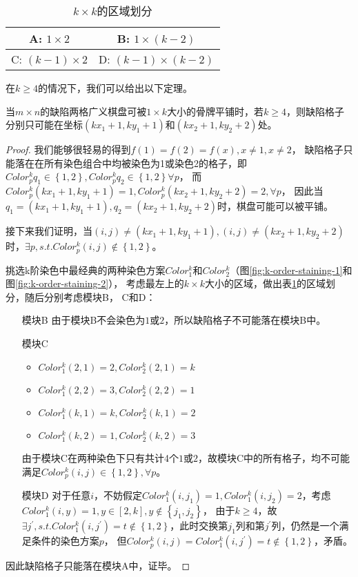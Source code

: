 \begin{table}[htbp]
	\centering
	\caption{$k \times k$的区域划分}
	\begin{tabular}{|c|c|}
		\hline
		A: $1 \times 2$       & B: $1  \times (k - 2)$     \\
		\hline
		C: $(k - 1) \times 2$ & D: $(k - 1)\times (k - 2)$ \\
		\hline
	\end{tabular}
	\label{fig:k-division}
\end{table}

在$k \ge 4$的情况下，我们可以给出以下定理。
\begin{theorem}
	\label{basic-theorem-3}
	当$m \times n$的缺陷两格广义棋盘可被$1 \times k$大小的骨牌平铺时，若$k \ge 4$，则缺陷格子分别只可能在坐标$(kx_1 + 1, ky_1 + 1)$和$(kx_2 + 1, ky_2 + 2)$处。
\end{theorem}
\begin{proof}
	我们能够很轻易的得到$f(1) = f(2) = f(x), x \neq 1, x \neq 2$，
	缺陷格子只能落在在所有染色组合中均被染色为1或染色2的格子，即$Color^k_pq_1 \in \left\{1, 2\right\}, Color^k_pq_2 \in \left\{1, 2\right\} \forall p$，
	而$Color^k_p(kx_1 + 1, ky_1 + 1) = 1, Color^k_p(kx_2 + 1, ky_2 + 2) = 2, \forall p$，
	因此当$q_1 = (kx_1 + 1, ky_1 + 1), q_2 = (kx_2 + 1, ky_2 + 2)$时，棋盘可能可以被平铺。

	接下来我们证明，当$(i, j) \neq (kx_1 + 1, ky_1 + 1), (i, j) \neq (kx_2 + 1, ky_2 + 2)$时，$\exists p, s.t. Color^k_p(i, j) \notin \left\{1, 2\right\}$。

	挑选k阶染色中最经典的两种染色方案$Color^k_1$和$Color^k_2$（图\ref{fig:k-order-staining-1}和图\ref{fig:k-order-staining-2}），
	考虑最左上的$k \times k$大小的区域，做出表\ref{fig:k-division}的区域划分，随后分别考虑模块B， C和D：

	\begin{itemize}
		\item[模块B] 由于模块B不会染色为$1$或$2$，所以缺陷格子不可能落在模块B中。
		\item[模块C]
			\begin{itemize}
				\item $Color^k_1(2, 1) = 2, Color^k_2(2, 1) = k$
				\item $Color^k_1(2, 2) = 3, Color^k_2(2, 2) = 1$
				\item $Color^k_1(k, 1) = k, Color^k_2(k, 1) = 2$
				\item $Color^k_1(k, 2) = 1, Color^k_2(k, 2) = 3$
			\end{itemize}
			由于模块C在两种染色下只有共计4个$1$或$2$，故模块C中的所有格子，均不可能满足$Color^k_p(i, j) \in \left\{1, 2\right\}, \forall p$。
		\item[模块D] 对于任意$i$，不妨假定$Color^k_1(i, j_1) = 1, Color^k_1(i, j_2) = 2$，考虑$Color^k_1(i, y) = 1, y \in [2, k], y \notin \left\{j_1, j_2\right\}$，
			由于$k \ge 4$，故$\exists j^{'}, s.t. Color^k_1(i, j^{'}) = t \notin \left\{1, 2\right\}$，此时交换第$j_1$列和第$j^{'}$列，仍然是一个满足条件的染色方案$p$，
			但$Color^k_p(i, j) = Color^k_1(i, j^{'}) = t \notin \left\{1, 2\right\}$，矛盾。
	\end{itemize}
	因此缺陷格子只能落在模块A中，证毕。
\end{proof}

